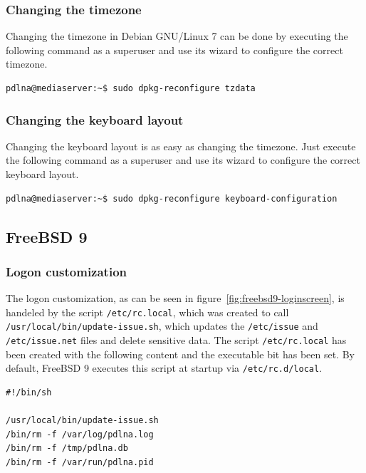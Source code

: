 \documentclass[a4paper,oneside,10pt]{report}
\newenvironment{colframefile}{%
  \begin{Sbox}
    \begin{minipage}{.99\columnwidth}
}{%
  \end{minipage}
  \end{Sbox}
  \begin{center}
    \fcolorbox{black}{Yellow}{\TheSbox}
  \end{center}
}
\begin{document}
\subsubsection{Changing the timezone}

Changing the timezone in Debian GNU/Linux 7 can be done by executing the following command as a superuser and use its wizard to configure the correct timezone.

\begin{lstlisting}
pdlna@mediaserver:~$ sudo dpkg-reconfigure tzdata
\end{lstlisting}

\subsubsection{Changing the keyboard layout}

Changing the keyboard layout is as easy as changing the timezone. Just execute the following command as a superuser and use its wizard to configure the correct keyboard layout.

\begin{lstlisting}
pdlna@mediaserver:~$ sudo dpkg-reconfigure keyboard-configuration
\end{lstlisting}

\subsection{FreeBSD 9}

\subsubsection{Logon customization}

The logon customization, as can be seen in figure~\ref{fig:freebsd9-loginscreen}, is handeled by the script \verb|/etc/rc.local|, which was created to call \verb|/usr/local/bin/update-issue.sh|, which updates the \verb|/etc/issue| and \verb|/etc/issue.net| files and delete sensitive data. The script \verb|/etc/rc.local| has been created with the following content and the executable bit has been set. By default, FreeBSD 9 executes this script at startup via \verb|/etc/rc.d/local|.
\begin{colframefile}
\begin{verbatim}
#!/bin/sh

/usr/local/bin/update-issue.sh
/bin/rm -f /var/log/pdlna.log
/bin/rm -f /tmp/pdlna.db
/bin/rm -f /var/run/pdlna.pid
\end{verbatim}
\end{colframefile}
\end{document}
